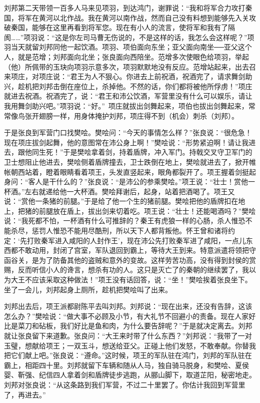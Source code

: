 \documentclass[12pt,UTF-8,openany]{ctexbook}
\begin{document}
\begin{normalsize}
    刘邦第二天带领一百多人马来见项羽，到达鸿门，谢罪说：“我和将军合力攻打秦国，将军在黄河以北作战。我在黄河以南作战，然而自己没有料想到能够先入关攻破秦国，能够在这里再看到将军您。现在有小人的流言，使将军和我有了隔阂……”项羽说：“这是你左司马曹无伤说的，不是这样的话，我怎么会这样呢？”项羽当天就留刘邦同他一起饮酒。项羽、项伯面向东坐；亚父面向南坐──亚父这个人，就是范增；刘邦面向北坐；张良面向西陪坐。范增多次使眼色给项羽，举起（他）所佩带的玉玦向项羽示意多次，项羽默默地没有反应。范增站起来，出去召来项庄，对项庄说：“君王为人不狠心。你进去上前祝酒，祝酒完了，请求舞剑助兴，趁机把刘邦击倒在座位上，杀掉他。不然的话，你们都将被他所俘虏！”项庄就进去祝酒。祝酒完了，说：“君王和沛公饮酒，军营里没有什么可以娱乐，请让我用舞剑助兴吧。”项羽说：“好。” 项庄就拔出剑舞起来，项伯也拔出剑舞起来，常常像鸟张开翅膀一样，用身体掩护刘邦，项庄得不到（机会）刺杀（刘邦）。
    
    于是张良到军营门口找樊哙。樊哙问：“今天的事情怎么样？”张良说：“很危急！现在项庄拔剑起舞，他的意图常在沛公身上啊！”樊哙说：“形势紧迫啊！请让我进去，跟他同生死！”于是樊哙拿着剑，持着盾牌，冲入军门。持戟交叉守卫军门的卫士想阻止他进去，樊哙侧着盾牌撞去，卫士跌倒在地上，樊哙就进去了，掀开帷帐朝西站着，瞪着眼睛看着项王，头发直竖起来，眼角都裂开了。项王握着剑挺起身问：“客人是干什么的？”张良说：“是沛公的参乘樊哙。”项王说：“壮士！赏他一杯酒。”左右就递给他一大杯酒。樊哙拜谢后，起身，站着把酒喝了。项王又说：“赏他一条猪的前腿。”于是给了他一个生的猪前腿。樊哙把他的盾牌扣在地上，把猪的前腿放在盾上，拔出剑来切着吃。项王说：“壮士！还能喝酒吗？”樊哙说：“我死都不怕，一杯酒有什么可推辞的？秦王有虎狼一样的心肠，杀人惟恐不能杀尽，惩罚人惟恐不能用尽酷刑，所以天下人都背叛他。怀王曾和诸将约定：‘先打败秦军进入咸阳的人封作王’，现在沛公先打败秦军进了咸阳，一点儿东西都不敢动用，封闭了宫室，军队退回到霸上，等待大王到来。特意派遣将领把守函谷关，是为了防备其他的盗贼和意外的变故。这样劳苦功高，没有得到封侯的赏赐，反而听信小人的谗言，想杀有功的人。这只是灭亡了的秦朝的继续罢了，我以为大王不应该采取这种做法！”项王没有话回答，说：“坐！”樊哙挨着张良坐下。坐了一会儿，刘邦起身上厕所，趁机把樊哙叫了出来。
    
    刘邦出去后，项王派都尉陈平去叫刘邦。刘邦说：“现在出来，还没有告辞，这该怎么办？”樊哙说：“做大事不必顾及小节，有大礼节不回避小的责备。现在人家好比是菜刀和砧板，我们好比是鱼和肉，为什么要告辞呢？”于是就决定离去。刘邦就让张良留下来道歉。张良问：“大王来时带了什么东西？”刘邦说：“我带了一对玉璧，想献给项王；一双玉斗，想送给亚父。正碰上他们发怒，不敢奉献。你替我把它们献上吧。”张良说：“遵命。”这时候，项王的军队驻在鸿门，刘邦的军队驻在霸上，相距四十里。刘邦就留下车辆和随从人马，独自骑马脱身，和樊哙、夏侯婴、靳强、纪信四人拿着剑和盾牌徒步逃跑，从郦山脚下，取道芷阳，秘密地走。刘邦对张良说：“从这条路到我们军营，不过二十里罢了。你估计我回到军营里了，再进去。”
    

\end{normalsize}
\end{document}
